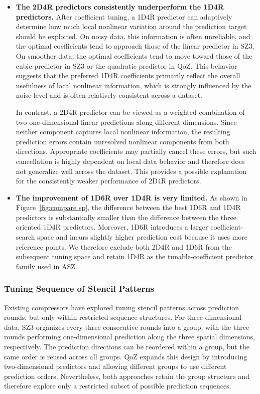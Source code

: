 \begin{itemize}
\item \textbf{The 2D4R predictors consistently underperform the 1D4R predictors.} After coefficient tuning, a 1D4R predictor can adaptively determine how much local nonlinear variation around the prediction target should be exploited. On noisy data, this information is often unreliable, and the optimal coefficients tend to approach those of the linear predictor in SZ3. On smoother data, the optimal coefficients tend to move toward those of the cubic predictor in SZ3 or the quadratic predictor in QoZ. This behavior suggests that the preferred 1D4R coefficients primarily reflect the overall usefulness of local nonlinear information, which is strongly influenced by the noise level and is often relatively consistent across a dataset.

In contrast, a 2D4R predictor can be viewed as a weighted combination of two one-dimensional linear predictions along different dimensions. Since neither component captures local nonlinear information, the resulting prediction errors contain unresolved nonlinear components from both directions. Appropriate coefficients may partially cancel these errors, but such cancellation is highly dependent on local data behavior and therefore does not generalize well across the dataset. This provides a possible explanation for the consistently weaker performance of 2D4R predictors.

\item \textbf{The improvement of 1D6R over 1D4R is very limited.} As shown in Figure~\ref{fig:compare sp}, the difference between the best 1D6R and 1D4R predictors is substantially smaller than the difference between the three oriented 1D4R predictors. Moreover, 1D6R introduces a larger coefficient-search space and incurs slightly higher prediction cost because it uses more reference points. We therefore exclude both 2D4R and 1D6R from the subsequent tuning space and retain 1D4R as the tunable-coefficient predictor family used in ASZ.
\end{itemize}

\subsubsection{Tuning Sequence of Stencil Patterns}\mbox{}

Existing compressors have explored tuning stencil patterns across prediction rounds, but only within restricted sequence structures. For three-dimensional data, SZ3 organizes every three consecutive rounds into a group, with the three rounds performing one-dimensional prediction along the three spatial dimensions, respectively. The prediction directions can be reordered within a group, but the same order is reused across all groups. QoZ expands this design by introducing two-dimensional predictors and allowing different groups to use different prediction orders. Nevertheless, both approaches retain the group structure and therefore explore only a restricted subset of possible prediction sequences.

